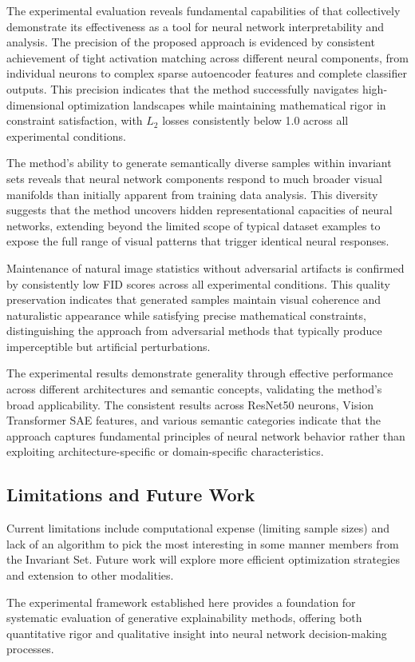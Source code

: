The experimental evaluation reveals fundamental capabilities of \method{} that collectively demonstrate its effectiveness as a tool for neural network interpretability and analysis. The precision of the proposed approach is evidenced by consistent achievement of tight activation matching across different neural components, from individual neurons to complex sparse autoencoder features and complete classifier outputs. This precision indicates that the method successfully navigates high-dimensional optimization landscapes while maintaining mathematical rigor in constraint satisfaction, with $L_2$ losses consistently below 1.0 across all experimental conditions.

The method's ability to generate semantically diverse samples within invariant sets reveals that neural network components respond to much broader visual manifolds than initially apparent from training data analysis. This diversity suggests that the method uncovers hidden representational capacities of neural networks, extending beyond the limited scope of typical dataset examples to expose the full range of visual patterns that trigger identical neural responses.

Maintenance of natural image statistics without adversarial artifacts is confirmed by consistently low FID scores across all experimental conditions. This quality preservation indicates that generated samples maintain visual coherence and naturalistic appearance while satisfying precise mathematical constraints, distinguishing the approach from adversarial methods that typically produce imperceptible but artificial perturbations.

The experimental results demonstrate generality through effective performance across different architectures and semantic concepts, validating the method's broad applicability. The consistent results across ResNet50 neurons, Vision Transformer SAE features, and various semantic categories indicate that the approach captures fundamental principles of neural network behavior rather than exploiting architecture-specific or domain-specific characteristics.

\subsection{Limitations and Future Work}

Current limitations include computational expense (limiting sample sizes) and lack of an algorithm to pick the most interesting in some manner members from the Invariant Set. Future work will explore more efficient optimization strategies and extension to other modalities.

The experimental framework established here provides a foundation for systematic evaluation of generative explainability methods, offering both quantitative rigor and qualitative insight into neural network decision-making processes.
